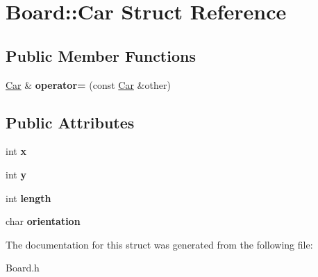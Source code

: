 \hypertarget{struct_board_1_1_car}{\section{Board\+:\+:Car Struct Reference}
\label{struct_board_1_1_car}
}
\subsection*{Public Member Functions}
\begin{DoxyCompactItemize}
\item 
\hypertarget{struct_board_1_1_car_abdac9ba633821eb4b5e1a517e3bd7153}{\hyperlink{struct_board_1_1_car}{Car} \& {\bfseries operator=} (const \hyperlink{struct_board_1_1_car}{Car} \&other)}\label{struct_board_1_1_car_abdac9ba633821eb4b5e1a517e3bd7153}

\end{DoxyCompactItemize}
\subsection*{Public Attributes}
\begin{DoxyCompactItemize}
\item 
\hypertarget{struct_board_1_1_car_a5368b78ce4204e3ffe32f59c2be7e785}{int {\bfseries x}}\label{struct_board_1_1_car_a5368b78ce4204e3ffe32f59c2be7e785}

\item 
\hypertarget{struct_board_1_1_car_a59328c0af4e58283914ebf6562cf6ee6}{int {\bfseries y}}\label{struct_board_1_1_car_a59328c0af4e58283914ebf6562cf6ee6}

\item 
\hypertarget{struct_board_1_1_car_a64a2c8d3024790015f07d48fe066ce55}{int {\bfseries length}}\label{struct_board_1_1_car_a64a2c8d3024790015f07d48fe066ce55}

\item 
\hypertarget{struct_board_1_1_car_ae07ef1311b2275cc6985714e91dafb29}{char {\bfseries orientation}}\label{struct_board_1_1_car_ae07ef1311b2275cc6985714e91dafb29}

\end{DoxyCompactItemize}


The documentation for this struct was generated from the following file\+:\begin{DoxyCompactItemize}
\item 
Board.\+h\end{DoxyCompactItemize}
